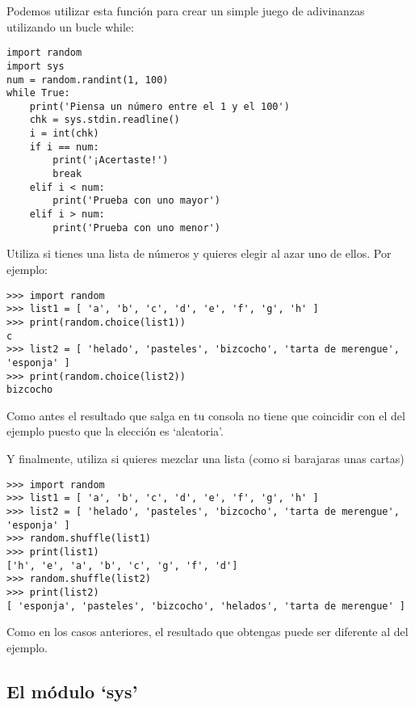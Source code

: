 Podemos utilizar esta función para crear un simple juego de adivinanzas utilizando un bucle while:

\begin{listingignore}
\begin{verbatim}
import random
import sys
num = random.randint(1, 100)
while True:
    print('Piensa un número entre el 1 y el 100')
    chk = sys.stdin.readline()
    i = int(chk)
    if i == num:
        print('¡Acertaste!')
        break
    elif i < num:
        print('Prueba con uno mayor')
    elif i > num:
        print('Prueba con uno menor')
\end{verbatim}
\end{listingignore}

Utiliza  si tienes una lista de números y quieres elegir al azar uno de ellos.  Por ejemplo:

\begin{listingignore}
\begin{verbatim}
>>> import random
>>> list1 = [ 'a', 'b', 'c', 'd', 'e', 'f', 'g', 'h' ]
>>> print(random.choice(list1))
c
>>> list2 = [ 'helado', 'pasteles', 'bizcocho', 'tarta de merengue', 'esponja' ]
>>> print(random.choice(list2))
bizcocho
\end{verbatim}
\end{listingignore}

Como antes el resultado que salga en tu consola no tiene que coincidir con el del ejemplo puesto que la elección es `aleatoria'.

Y finalmente, utiliza  si quieres mezclar una lista (como si barajaras unas cartas)

\begin{listingignore}
\begin{verbatim}
>>> import random
>>> list1 = [ 'a', 'b', 'c', 'd', 'e', 'f', 'g', 'h' ]
>>> list2 = [ 'helado', 'pasteles', 'bizcocho', 'tarta de merengue', 'esponja' ]
>>> random.shuffle(list1)
>>> print(list1)
['h', 'e', 'a', 'b', 'c', 'g', 'f', 'd']
>>> random.shuffle(list2)
>>> print(list2)
[ 'esponja', 'pasteles', 'bizcocho', 'helados', 'tarta de merengue' ]
\end{verbatim}
\end{listingignore}

Como en los casos anteriores, el resultado que obtengas puede ser diferente al del ejemplo.

\subsection*{El módulo `sys'}

